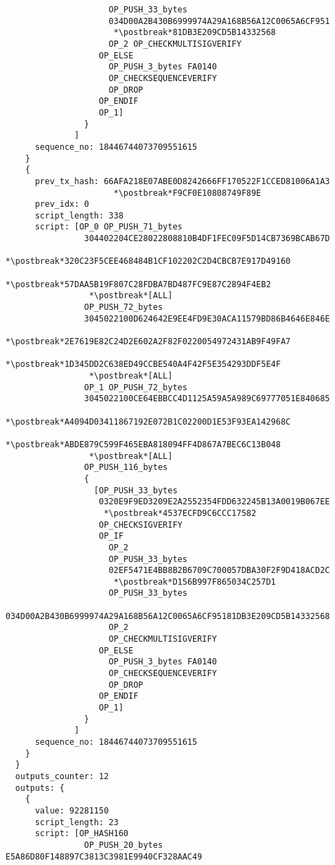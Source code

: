 \begin{lstlisting}
                     OP_PUSH_33_bytes
                     034D00A2B430B6999974A29A168B56A12C0065A6CF951
                      *\postbreak*81DB3E209CD5B14332568
                     OP_2 OP_CHECKMULTISIGVERIFY
                   OP_ELSE
                     OP_PUSH_3_bytes FA0140
                     OP_CHECKSEQUENCEVERIFY
                     OP_DROP
                   OP_ENDIF
                   OP_1]
                }
              ]
      sequence_no: 18446744073709551615
    }
    {
      prev_tx_hash: 66AFA218E07ABE0D8242666FF170522F1CCED81006A1A3
                      *\postbreak*F9CF0E10808749F89E
      prev_idx: 0
      script_length: 338
      script: [OP_0 OP_PUSH_71_bytes
                304402204CE28022808810B4DF1FEC09F5D14CB7369BCAB67D
                 *\postbreak*320C23F5CEE468484B1CF102202C2D4CBCB7E917D49160
                 *\postbreak*57DAA5B19F807C28FDBA7BD487FC9E87C2894F4EB2
                 *\postbreak*[ALL]
                OP_PUSH_72_bytes
                3045022100D624642E9EE4FD9E30ACA11579BD86B4646E846E
                 *\postbreak*2E7619E82C24D2E602A2F82F0220054972431AB9F49FA7
                 *\postbreak*1D345DD2C638ED49CCBE540A4F42F5E354293DDF5E4F
                 *\postbreak*[ALL]
                OP_1 OP_PUSH_72_bytes
                3045022100CE64EBBCC4D1125A59A5A989C69777051E840685
                 *\postbreak*A4094D03411867192E072B1C02200D1E53F93EA142968C
                 *\postbreak*ABDE879C599F465EBA818094FF4D867A7BEC6C13B048
                 *\postbreak*[ALL]
                OP_PUSH_116_bytes
                {
                  [OP_PUSH_33_bytes
                   0320E9F9ED3209E2A2552354FDD632245B13A0019B067EE
                    *\postbreak*4537ECFD9C6CCC17582
                   OP_CHECKSIGVERIFY
                   OP_IF
                     OP_2
                     OP_PUSH_33_bytes
                     02EF5471E4BB8B2B6709C700057DBA30F2F9D418ACD2C
                      *\postbreak*D156B997F865034C257D1
                     OP_PUSH_33_bytes
                     034D00A2B430B6999974A29A168B56A12C0065A6CF95181DB3E209CD5B14332568
                     OP_2
                     OP_CHECKMULTISIGVERIFY
                   OP_ELSE
                     OP_PUSH_3_bytes FA0140
                     OP_CHECKSEQUENCEVERIFY
                     OP_DROP
                   OP_ENDIF
                   OP_1]
                }
              ]
      sequence_no: 18446744073709551615
    }
  }
  outputs_counter: 12
  outputs: {
    {
      value: 92281150
      script_length: 23
      script: [OP_HASH160
                OP_PUSH_20_bytes E5A86D80F148897C3813C3981E9940CF328AAC49

\end{lstlisting}
